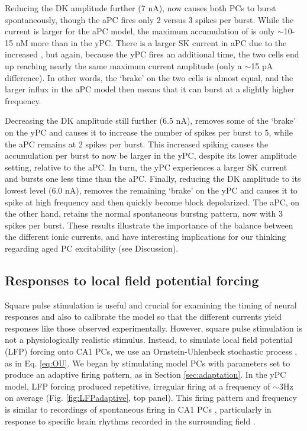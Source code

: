 \documentclass[12pt]{article}
\begin{document}
Reducing the DK amplitude further (7 nA), now causes both PCs to burst spontaneously, though the aPC fires only 2 versus 3 spikes per burst. While the {\Ca} current is larger for the aPC model, the maximum accumulation of {\Ca} is only $\sim$10-15 nM more than in the yPC. There is a larger SK current in aPC due to the increased {\Ca}, but again, because the yPC fires an additional time, the two cells end up reaching nearly the same maximum current amplitude (only a $\sim$15 pA difference). In other words, the `brake' on the two cells is almost equal, and the larger {\Ca} influx in the aPC model then means that it can burst at a slightly higher frequency. 

Decreasing the DK amplitude still further (6.5 nA), removes some of the `brake' on the yPC and causes it to increase the number of spikes per burst to 5, while the aPC remains at 2 spikes per burst. This increased spiking causes the {\Ca} accumulation per burst to now be larger in the yPC, despite its lower amplitude setting, relative to the aPC. In turn, the yPC experiences a larger SK current and bursts one less time than the aPC. Finally, reducing the DK amplitude to its lowest level (6.0 nA), removes the remaining `brake' on the yPC and causes it to spike at high frequency and then quickly become block depolarized. The aPC, on the other hand, retains the normal spontaneous burstng pattern, now with 3 spikes per burst. These results illustrate the importance of the balance between the different ionic currents, and have interesting implications for our thinking regarding aged PC excitability (see Discussion).

\subsection{Responses to local field potential forcing}
Square pulse stimulation is useful and crucial for examining the timing of neural responses and also to calibrate the model so that the different currents yield responses like those observed experimentally. However, square pulse stimulation is not a physiologically realistic stimulus. Instead, to simulate local field potential (LFP) forcing onto CA1 PCs, we use an Ornstein-Uhlenbeck stochastic process \citep{rudolph2004method,destexhe2004novel}, as in Eq. \ref{eq:OU}. We began by stimulating model PCs with parameters set to produce an adaptive firing pattern, as in Section \ref{sec:adaptation}. In the yPC model, LFP forcing produced repetitive, irregular firing at a frequency of $\sim$3Hz on average (Fig. \ref{fig:LFPadaptive}, top panel). This firing pattern and frequency is similar to recordings of spontaneous firing in CA1 PCs \citep{manseau2017tuning,yang2017dl}, particularly in response to specific brain rhythms recorded in the surrounding field \citep{bland2002relationship,bland2005heterogeneity,huh2016excitatory}.
\end{document}
